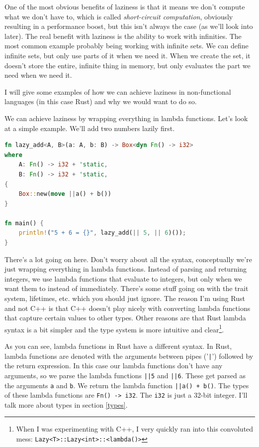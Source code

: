 \documentclass[11pt]{article}
\begin{document}
One of the most obvious benefits of laziness is that it means we don't compute
what we don't have to, which is called \emph{short-circuit computation},
obviously resulting in a performance boost, but this isn't always the case (as
we'll look into later). The real benefit with laziness is the ability to work
with infinities. The most common example probably being working with infinite
sets. We can define infinite sets, but only use parts of it when we need it.
When we create the set, it doesn't store the entire, infinite thing in memory,
but only evaluates the part we need when we need it.

I will give some examples of how we can achieve laziness in non-functional
languages (in this case Rust) and why we would want to do so.

We can achieve laziness by wrapping everything in lambda functions. Let's look
at a simple example. We'll add two numbers lazily first.

\begin{lstlisting}[language=Rust]
fn lazy_add<A, B>(a: A, b: B) -> Box<dyn Fn() -> i32>
where
    A: Fn() -> i32 + 'static,
    B: Fn() -> i32 + 'static,
{
    Box::new(move ||a() + b())
}

fn main() {
    println!("5 + 6 = {}", lazy_add(|| 5, || 6)());
}
\end{lstlisting}

There's a lot going on here. Don't worry about all the syntax, conceptually
we're just wrapping everything in lambda functions. Instead of parsing and
returning integers, we use lambda functions that evaluate to integers, but only
when we want them to instead of immediately. There's some stuff going on with
the trait system, lifetimes, etc. which you should just ignore. The reason I'm
using Rust and not C++ is that C++ doesn't play nicely with converting lambda
functions that capture certain values to other types. Other reasons are that
Rust lambda syntax is a bit simpler and the type system is more intuitive and
clear\footnote{When I was experimenting with C++, I very quickly ran into this
convoluted mess: \texttt{Lazy<T>::Lazy<int>::<lambda()>}}.

As you can see, lambda functions in Rust have a different syntax. In Rust,
lambda functions are denoted with the arguments between pipes ('\texttt{|}')
followed by the return expression. In this case our lambda functions don't have
any arguments, so we parse the lambda functions \texttt{||5} and \texttt{||6}.
These get parsed as the arguments \texttt{a} and \texttt{b}. We return the
lambda function \texttt{||a() + b()}. The types of these lambda functions are
\texttt{Fn()\ ->\ i32}. The \texttt{i32} is just a 32-bit integer. I'll talk
more about types in section \ref{types}.
\end{document}
